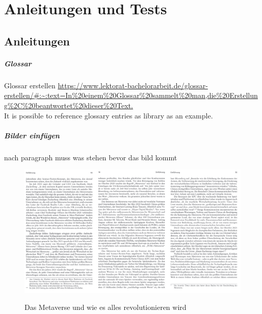 \chapter{Anleitungen und Tests}\label{ch:Anleitungen}

\section{Anleitungen}

\paragraph*{Glossar}

Glossar erstellen \url{https://www.lektorat-bachelorarbeit.de/glossar-erstellen/#:~:text=In%20einem%20Glossar%20sammelt%20man,die%20Erstellung%2C%20beantwortet%20dieser%20Text.} \\
It is possible to reference glossary entries as \gls{library} as an example.

\paragraph{Bilder einfügen}
nach paragraph muss was stehen bevor das bild kommt

\begin{figure}[!h]
    \centering
\includegraphics[width = 15cm]{figures/Das_Metaverse_uwearw13-15.png}
\caption{Das Metaverse und wie es alles revolutionieren wird}
\cite{Ball22}
\label{fig:testbild}
\end{figure}



